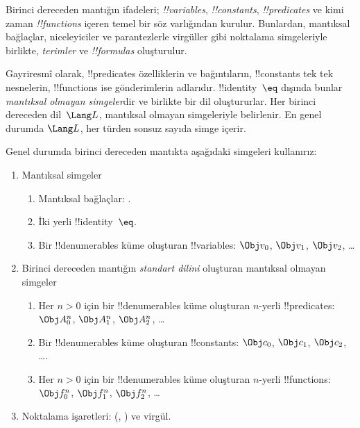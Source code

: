 




Birinci dereceden mantığın ifadeleri; \emph{!!{variable}s},
\emph{!!{constant}s}, \emph{!!{predicate}s} ve kimi zaman
\emph{!!{function}s} içeren temel bir söz varlığından kurulur. Bunlardan,
mantıksal bağlaçlar, niceleyiciler ve parantezlerle virgüller gibi
noktalama simgeleriyle birlikte, \emph{terimler} ve
\emph{!!{formula}s} oluşturulur.

\begin{explain}
Gayriresmî olarak, !!{predicate}s özelliklerin ve bağıntıların,
!!{constant}s tek tek nesnelerin, !!{function}s ise gönderimlerin
adlarıdır. !!{identity}~$\eq$ dışında bunlar \emph{mantıksal olmayan
simgeler}dir ve birlikte bir dil oluştururlar. Her birinci dereceden
dil~$\Lang L$, mantıksal olmayan simgeleriyle belirlenir. En genel
durumda $\Lang L$, her türden sonsuz sayıda simge içerir.
\end{explain}

Genel durumda birinci dereceden mantıkta aşağıdaki simgeleri kullanırız:

\begin{enumerate}
\item Mantıksal simgeler
\begin{enumerate}
\item Mantıksal bağlaçlar:
  \startycommalist
  .
\item İki yerli !!{identity}~$\eq$.
\item Bir !!{denumerable}s küme oluşturan !!{variable}s: $\Obj v_0$, $\Obj v_1$, $\Obj
  v_2$, \dots
\end{enumerate}
\item Birinci dereceden mantığın \emph{standart dilini} oluşturan
  mantıksal olmayan simgeler
\begin{enumerate}
\item Her $n>0$ için bir !!{denumerable}s küme oluşturan $n$-yerli !!{predicate}s: $\Obj
  A^n_0$, $\Obj A^n_1$, $\Obj A^n_2$, \dots
\item Bir !!{denumerable}s küme oluşturan !!{constant}s: $\Obj c_0$, $\Obj c_1$, $\Obj
  c_2$, \dots.
\item Her $n>0$ için bir !!{denumerable}s küme oluşturan $n$-yerli !!{function}s:
  $\Obj f^n_0$, $\Obj f^n_1$, $\Obj f^n_2$, \dots
\end{enumerate}
\item Noktalama işaretleri: (, ) ve virgül.
\end{enumerate}

